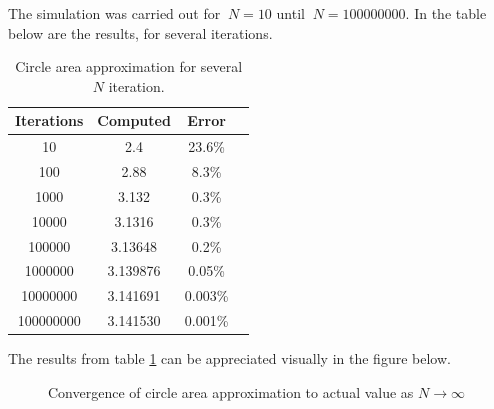 \documentclass{article}
\begin{document}
The simulation was carried out for $\ N = 10$ until $\ N = 100000000$. In the table below are the results, for several iterations.

\begin{table}[H]
  \begin{center}
    \begin{tabular}{|c|c|c|c|}
      \hline
      Iterations & Computed & Error \\
      \hline
      10 & 2.4 & 23.6\% \\
      \hline
      100 & 2.88 & 8.3\% \\
      \hline
      1000 & 3.132 & 0.3\% \\
      \hline
      10000 & 3.1316 & 0.3\% \\
      \hline
      100000 & 3.13648 & 0.2\% \\
      \hline
      1000000 & 3.139876 & 0.05\% \\
      \hline
      10000000 & 3.141691 & 0.003\% \\
      \hline
      100000000 & 3.141530 & 0.001\% \\
      \hline
    \end{tabular}
  \end{center}
  \caption {Circle area approximation for several  $N$ iteration.}
  \label{tab:circle_results}
\end{table}

The results from table \ref{tab:circle_results} can be appreciated visually in the figure below.

\begin{figure}[H]
  \begin{center}
  \end{center}
  \caption{Convergence of circle area approximation to actual value as $N\to \infty$}
  \label{fig:dim_2_plot}
\end{figure}
\end{document}
